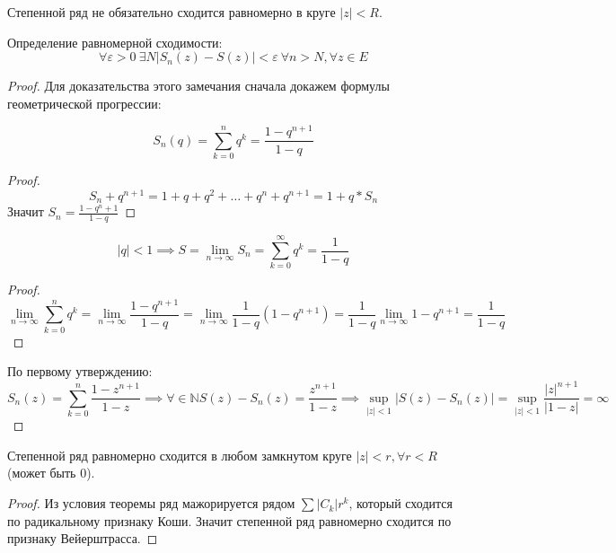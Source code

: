 \begin{note}
    Степенной ряд не обязательно сходится равномерно в круге $\left| z \right| < R$. 

    Определение равномерной сходимости: 
    \[\forall \varepsilon > 0 \ \exists N \left| S_n(z) - S(z) \right| < \varepsilon \ \forall n > N, \forall z \in E\]

    \begin{proof}
        Для доказательства этого замечания сначала докажем формулы геометрической прогрессии:
        \begin{statement*}
            \[S_n(q) = \sum_{k = 0}^{n}q^k = \frac{1 - q^{n+1}}{1-q}\]
            \begin{proof}
                \[S_n + q^{n+1} = 1 + q + q^2 + \hdots + q^n + q^{n+1} = 1 + q*S_n\]
                Значит $S_n = \frac{1-q^n+1}{1-q}$
            \end{proof}
        \end{statement*}
        \begin{statement*}
            \[\left|q \right| < 1 \implies S = \lim_{n \to \infty} S_n = \sum_{k=0}^{\infty} q^k = \frac{1}{1-q}\]
            \begin{proof}
                \[\lim_{n \to \infty} \sum_{k=0}^{n}q^k = \lim_{n \to \infty}\frac{1 - q^{n+1}}{1-q} = \lim_{n \to \infty}\frac{1}{1-q}(1-q^{n+1}) = \frac{1}{1-q}\lim_{n \to \infty}1-q^{n+1} = \frac{1}{1-q}\]
            \end{proof}
        \end{statement*}

        По первому утверждению: 
        \[S_n(z) = \sum_{k=0}^{n}\frac{1-z^{n+1}}{1-z} \implies \forall \in \mathbb{N} S(z) - S_n(z) = \frac{z^{n+1}}{1-z} \implies \underset{\left| z \right| < 1}{\sup}\left| S(z) - S_n(z) \right| = \underset{\left| z \right| < 1}{\sup} \frac{\left| z \right|^{n+1}}{\left| 1 - z\right|} = \infty\]
    \end{proof}
\end{note}


\begin{note}
    Степенной ряд равномерно сходится в любом замкнутом круге $\left| z \right| < r, \forall r < R$ (может быть 0).

    \begin{proof}
        Из условия теоремы ряд мажорируется рядом $\sum \left| C_k\right| r^k$, который сходится по радикальному признаку Коши. Значит степенной ряд равномерно сходится по признаку Вейерштрасса.
    \end{proof}
\end{note}

